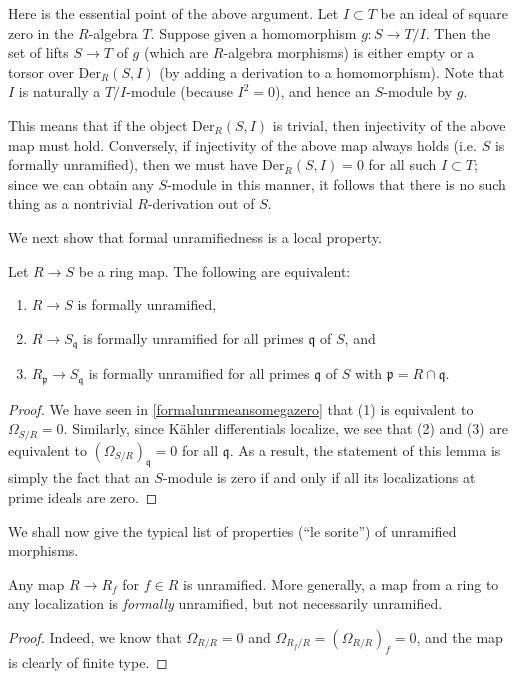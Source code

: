 Here is the essential point of the above argument. Let $I \subset T$ be an
ideal of square zero in the $R$-algebra $T$. 
Suppose given a homomorphism $g: S \to T/I$.
Then the set of lifts $S \to T$ of $g$ (which are $R$-algebra morphisms)
is either empty or a torsor over 
$\mathrm{Der}_R(S, I)$ (by adding a derivation to
a homomorphism). 
Note that $I$ is naturally a $T/I$-module (because $I^2 = 0$), and hence an
$S$-module by $g$.

This means that if the object $\mathrm{Der}_R(S, I)$ is trivial, then
injectivity of the above map must hold. 
Conversely, if injectivity of the above map always holds (i.e. $S$ is formally
unramified),
then we must have $\mathrm{Der}_R(S, I) = 0$ for all such $I \subset T$; since
we can obtain any $S$-module in this manner, it follows that there is no such
thing as  a nontrivial $R$-derivation out of $S$.


We next show that formal unramifiedness is a local property.
\begin{lemma}
\label{lemma-formally-unramified-local}
Let $R \to S$ be a ring map.
The following are equivalent:
\begin{enumerate}
\item $R \to S$ is formally unramified,
\item $R \to S_{\mathfrak q}$ is formally unramified for all
primes $\mathfrak q$ of $S$, and
\item $R_{\mathfrak p} \to S_{\mathfrak q}$ is formally unramified
for all primes $\mathfrak q$ of $S$ with $\mathfrak p = R \cap \mathfrak q$.
\end{enumerate}
\end{lemma}

\begin{proof}
We have seen in
\cref{formalunrmeansomegazero}
that (1) is equivalent to
$\Omega_{S/R} = 0$. Similarly, since K\"ahler differentials localize, we see that (2) and (3)
are equivalent to $(\Omega_{S/R})_{\mathfrak q} = 0$ for all
$\mathfrak q$. 
As a result, the statement of this lemma is simply the fact that an $S$-module
is zero if and only if all its localizations at prime ideals are zero. 
\end{proof}

We shall now give the typical list of properties (``le sorite'') of unramified morphisms.

\begin{proposition} \label{locunramified}
Any map $R \to R_f$ for $f \in  R$ is unramified.
More generally, a map from a ring to any localization is \emph{formally}
unramified, but not necessarily unramified. 
\end{proposition} 
\begin{proof} 
Indeed, we know that $\Omega_{R/R}  = 0$ and $\Omega_{R_f/R } =
(\Omega_{R/R})_f=0$, and the map is clearly of finite type.
\end{proof} 

